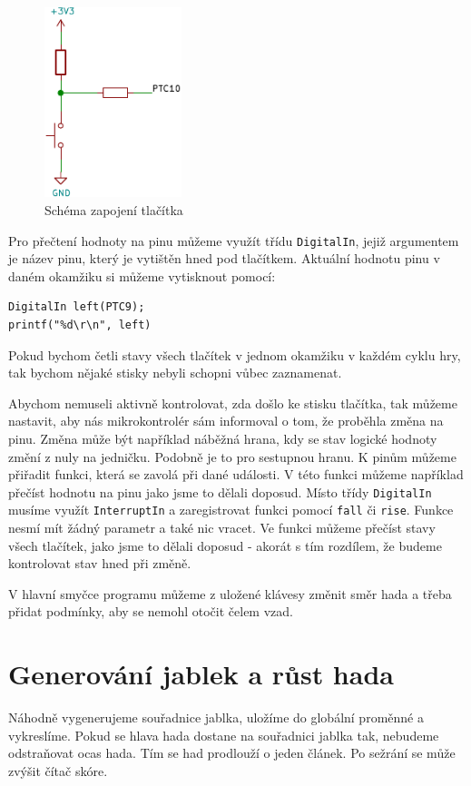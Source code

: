 \documentclass[12pt]{article}
\begin{document}
\begin{figure}[ht]
\centering
  \includegraphics[width=4cm]{figures/button}
\caption{Schéma zapojení tlačítka}
 \label{fig:button}
\end{figure}
\FloatBarrier

Pro přečtení hodnoty na pinu můžeme využít třídu \texttt{DigitalIn}, jejiž argumentem je název pinu, který je vytištěn hned pod tlačítkem.
Aktuální hodnotu pinu v daném okamžiku si můžeme vytisknout pomocí:
\begin{verbatim}
DigitalIn left(PTC9);
printf("%d\r\n", left)
\end{verbatim}

Pokud bychom četli stavy všech tlačítek v jednom okamžiku v každém cyklu hry, tak bychom nějaké stisky nebyli schopni vůbec zaznamenat. 

Abychom nemuseli aktivně kontrolovat, zda došlo ke stisku tlačítka, tak můžeme nastavit, aby nás mikrokontrolér sám informoval o tom, že proběhla změna na pinu.
Změna může být například náběžná hrana, kdy se stav logické hodnoty změní z nuly na jedničku.
Podobně je to pro sestupnou hranu.
K pinům můžeme přiřadit funkci, která se zavolá při dané události.
V této funkci můžeme například přečíst hodnotu na pinu jako jsme to dělali doposud.
Místo třídy \texttt{DigitalIn} musíme využít \texttt{InterruptIn} a zaregistrovat funkci pomocí \texttt{fall} či \texttt{rise}.
Funkce nesmí mít žádný parametr a také nic vracet.
Ve funkci můžeme přečíst stavy všech tlačítek, jako jsme to dělali doposud - akorát s tím rozdílem, že budeme kontrolovat stav hned při změně.

V hlavní smyčce programu můžeme z uložené klávesy změnit směr hada a třeba přidat podmínky, aby se nemohl otočit čelem vzad.

\section{Generování jablek a růst hada}
Náhodně vygenerujeme souřadnice jablka, uložíme do globální proměnné a vykreslíme.
Pokud se hlava hada dostane na souřadnici jablka tak, nebudeme odstraňovat ocas hada.
Tím se had prodlouží o jeden článek.
Po sežrání se může zvýšit čítač skóre.
\end{document}
